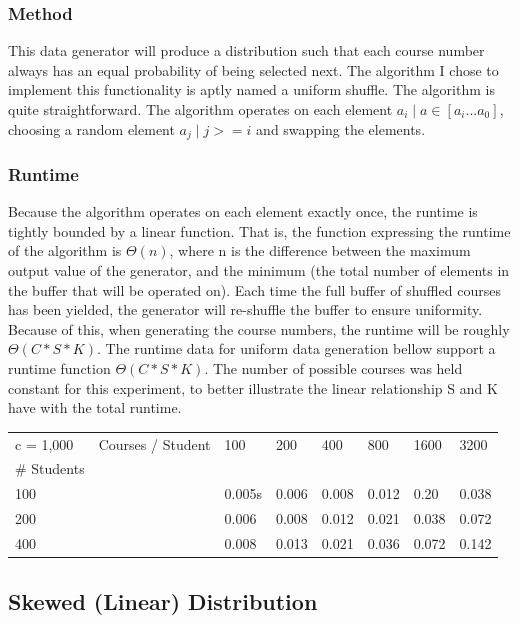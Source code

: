 \documentclass[11pt]{article}
\begin{document}
        \subsubsection {Method}
            This data generator will produce a distribution such that each course number always has an equal probability of being selected next. The algorithm I chose to implement this functionality is aptly named a uniform shuffle. The algorithm is quite straightforward. The algorithm operates on each element $a_i \mid a \in [a_i...a_0]$, choosing a random element $a_j \mid j >= i$ and swapping the elements.
        \subsubsection{Runtime}
            Because the algorithm operates on each element exactly once, the runtime is tightly bounded by a linear function. That is, the function expressing the runtime of the algorithm is $\Theta(n)$, where n is the difference between the maximum output value of the generator, and the minimum (the total number of elements in the buffer that will be operated on). Each time the full buffer of shuffled courses has been yielded, the generator will re-shuffle the buffer to ensure uniformity. Because of this, when generating the course numbers, the runtime will be roughly $\Theta(C *S * K )$. The runtime data for uniform data generation bellow support a runtime function $\Theta(C*S*K)$. The number of possible courses was held constant for this experiment, to better illustrate the linear relationship S and K have with the total runtime.

	\begin{table}[h!]
	\begin{tabular}{llllllll}
	c = 1,000   & Courses / Student & 100    & 200   & 400   & 800   & 1600  & 3200  \\
	\# Students &                   &        &       &       &       &       &       \\
	100         &                   & 0.005s & 0.006  & 0.008 & 0.012 & 0.20  & 0.038 \\
	200         &                   & 0.006  & 0.008 & 0.012 & 0.021 & 0.038 & 0.072 \\
	400         &                   & 0.008  & 0.013 & 0.021 & 0.036 & 0.072 & 0.142
	\end{tabular}
	\end{table}
    \subsection{Skewed (Linear) Distribution}
\end{document}
